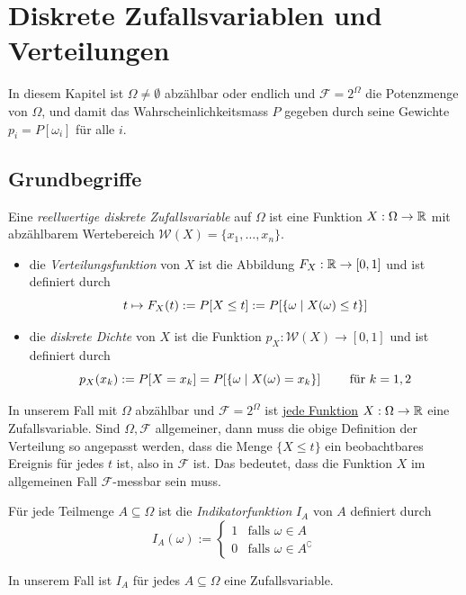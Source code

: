 \section{Diskrete Zufallsvariablen und Verteilungen}
In diesem Kapitel ist $\Omega \neq \emptyset$ abzählbar oder endlich und $\mathcal{F} =  2^\Omega$ die Potenzmenge von $\Omega$, und damit das Wahrscheinlichkeitsmass $P$ gegeben durch seine Gewichte $p_i = P[\omega_i]$ für alle $i$.

\subsection{Grundbegriffe}
\begin{definition}
Eine \textit{reellwertige diskrete Zufallsvariable} auf $\Omega$ ist eine Funktion $X:\Omega \to \mathbb{R}$ mit abzählbarem Wertebereich $\mathcal{W}(X) = \{x_1,\dots,x_n\}$.
\begin{itemize}
\item die \textit{Verteilungsfunktion} von $X$ ist die Abbildung $F_X : \mathbb{R} \to [0,1]$ und ist definiert durch
$$ t \mapsto F_X(t) := P[X \leq t] := P[\{\omega \;|\; X(\omega) \leq t\}]$$
\item die \textit{diskrete Dichte} von $X$ ist die Funktion $p_X : \mathcal{W}(X) \to [0,1]$ und ist definiert durch 
$$ p_X(x_k) := P[X = x_k] = P[\{\omega \;|\; X(\omega) = x_k\}] \quad \quad \mbox{ für } k =1,2$$
\end{itemize}
\end{definition}
In unserem Fall mit $\Omega$ abzählbar und $\mathcal{F} = 2^\Omega$ ist \underline{jede Funktion} $X:\Omega \to \mathbb{R}$ eine Zufallsvariable. Sind $\Omega, \mathcal{F}$ allgemeiner, dann muss die obige Definition der Verteilung so angepasst werden, dass die Menge $\{X \leq t\}$ ein beobachtbares Ereignis für jedes $t$ ist, also in $\mathcal{F}$ ist. Das bedeutet, dass die Funktion $X$ im allgemeinen Fall $\mathcal{F}$-messbar sein muss.

\begin{definition}
Für jede Teilmenge $A \subseteq \Omega$ ist die \textit{Indikatorfunktion} $I_A$ von $A$ definiert durch 
$$ I_A(\omega) := \begin{cases} 1 & \mbox{falls } \omega \in A \\ 0 & \mbox{falls } \omega \in A^\complement \end{cases}$$
\end{definition}
In unserem Fall ist $I_A$ für jedes $A \subseteq \Omega$ eine Zufallsvariable.

